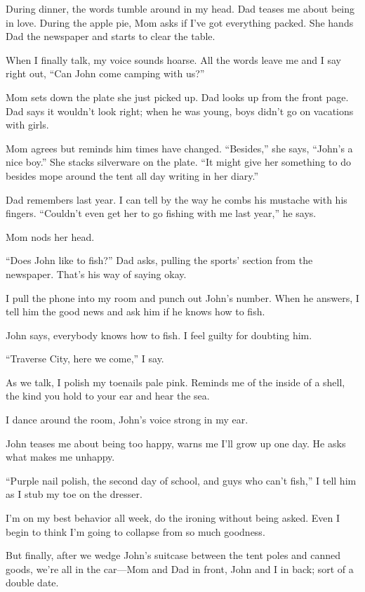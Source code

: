 \documentclass[twoside,10pt]{book}
\begin{document}
During dinner, the words tumble around in my head. Dad teases me about
being in love. Dur­ing the apple pie, Mom asks if I've got everything
packed. She hands Dad the newspaper and starts to clear the table.

When I finally talk, my voice sounds hoarse. All the words leave me and
I say right out, ``Can John come camping with us?''

Mom sets down the plate she just picked up. Dad looks up from the front
page. Dad says it wouldn't look right; when he was young, boys didn't go
on vacations with girls.

Mom agrees but reminds him times have changed. ``Besides,'' she says,
``John's a nice boy.'' She stacks silverware on the plate. ``It might
give her something to do besides mope around the tent all day writing in
her diary.''

Dad remembers last year. I can tell by the way he combs his mustache
with his fingers. ``Couldn't even get her to go fishing with me last
year,'' he says.

Mom nods her head.

``Does John like to fish?'' Dad asks, pulling the sports' section from
the newspaper. That's his way of saying okay.

I pull the phone into my room and punch out John's number. When he
answers, I tell him the good news and ask him if he knows how to fish.

John says, everybody knows how to fish. I feel guilty for doubting him.

``Traverse City, here we come,'' I say.

As we talk, I polish my toenails pale pink. Reminds me of the inside of
a shell, the kind you hold to your ear and hear the sea.

I dance around the room, John's voice strong in my ear.

John teases me about being too happy, warns me I'll grow up one day. He
asks what makes me unhappy.

``Purple nail polish, the second day of school, and guys who can't
fish,'' I tell him as I stub my toe on the dresser.

I'm on my best behavior all week, do the ironing without being asked.
Even I begin to think I'm going to collapse from so much goodness.

But finally, after we wedge John's suitcase between the tent poles and
canned goods, we're all in the car---Mom and Dad in front, John and I in
back; sort of a double date.
\end{document}
